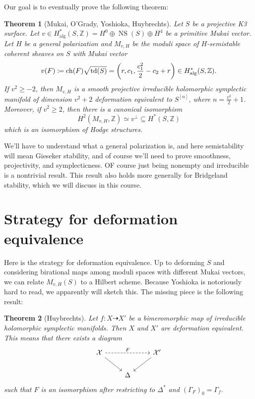 \documentclass[leqno, openany]{memoir}
\newtheorem{thm}{Theorem}[section]
\theoremstyle{definition}
\theoremstyle{remark}
\theoremstyle{plain}
\theoremstyle{definition}
\theoremstyle{remark}
\newcommand{\Z}{\mathbb{Z}}
\newcommand{\mc}[1]{\mathcal{#1}}
\newcommand{\mr}[1]{\mathrm{#1}}
\DeclareMathOperator{\NS}{NS}
\begin{document}
Our goal is to eventually prove the following theorem:
\begin{thm}[Mukai, O'Grady, Yoshioka, Huybrechts]
    Let $S$ be a projective K3 surface. Let $v \in H^*_{\mr{alg}}(S, \Z) = H^0 \oplus \NS(S) \oplus H^4$ be a primitive Mukai vector. Let $H$ be a general polarization and $M_{v, H}$ be the moduli space of $H$-semistable coherent sheaves on $S$ with Mukai vector 
    \[ v(F) \coloneqq \mr{ch}(F) \sqrt{\mr{td}(S)} = \qty(r, c_1, \frac{c_1^2}{2} - c_2 + r) \in H^*_{\mr{alg}}(S, \Z). \]
    If $v^2 \geq -2$, then $M_{v, H}$ is a smooth projective irreducible holomorphic symplectic manifold of dimension $v^2 + 2$ deformation equivalent to $S^{[n]}$, where $n = \frac{v^2}{2} +1$. Moreover, if $v^2 \geq 2$, then there is a canonical isomorphism
    \[ H^2(M_{v, H}, \Z) \simeq v^{\perp} \subseteq H^*(S, \Z) \]
    which is an isomorphism of Hodge structures.
\end{thm}

We'll have to understand what a general polarization is, and here semistability will mean Gieseker stability, and of course we'll need to prove smoothness, projectivity, and symplecticness. OF course just being nonempty and irreducible is a nontrivial result. This result also holds more generally for Bridgeland stability, which we will discuss in this course.

\section{Strategy for deformation equivalence}%
\label{sec:strategy_for_deformation_equivalence}

Here is the strategy for deformation equivalence. Up to deforming $S$ and considering birational maps among moduli spaces with different Mukai vectors, we can relate $M_{v, H}(S)$ to a Hilbert scheme. Because Yoshioka is notoriously hard to read, we apparently will sketch this. The missing piece is the following result:

\begin{thm}[Huybrechts]
    Let $f \colon X \dashrightarrow X'$ be a bimeromorphic map of irreducible holomorphic symplectic manifolds. Then $X$ and $X'$ are deformation equivalent. This means that there exists a diagram
    \begin{equation*}
    \begin{tikzcd}
        \mc{X} \ar[dashrightarrow]{rr}{F} \ar{dr} & & \mc{X}' \ar{dl} \\
        & \Delta
    \end{tikzcd}
    \end{equation*}
    such that $F$ is an isomorphism after restricting to $\Delta^*$ and $(\Gamma_F)_0 = \Gamma_f$.
\end{thm}
\end{document}
